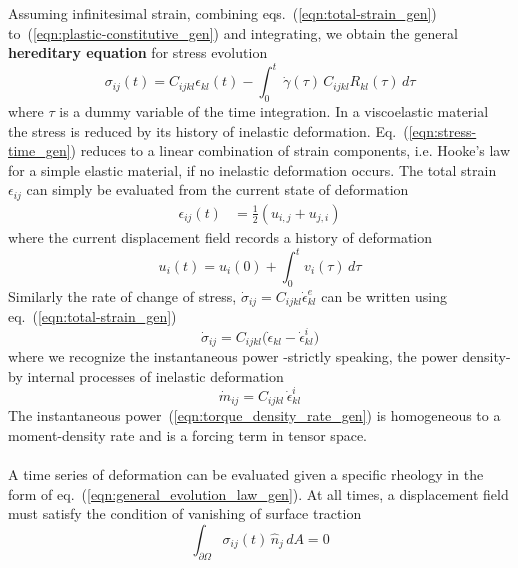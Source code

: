 \documentclass[letterpaper,12pt,]{memoir}
\begin{document}
Assuming infinitesimal strain, combining eqs.~(\ref{eqn:total-strain_gen}) to~(\ref{eqn:plastic-constitutive_gen}) and integrating, we obtain the general \textbf{hereditary equation} for stress evolution
%
\begin{equation}\label{eqn:stress-time_gen}
\sigma_{ij}(t)=C_{ijkl}\epsilon_{kl}(t)-\int_0^t\,\dot{\gamma}(\tau)\,C_{ijkl}R_{kl}(\tau)\,d\tau
\end{equation}
%
where $\tau$ is a dummy variable of the time integration. In a viscoelastic material the stress is reduced by its history of inelastic deformation. Eq.~(\ref{eqn:stress-time_gen}) reduces to a linear combination of strain components, i.e. Hooke's law for a simple elastic material, if no inelastic deformation occurs. The total strain $\epsilon_{ij}$ can simply be evaluated from the current state of deformation 
%
\begin{equation}\label{eqn:gradient}
\begin{aligned}
\epsilon_{ij}(t)&=\frac{1}{2}\left(u_{i,j}+u_{j,i}\right)
\end{aligned}
\end{equation}
%
where the current displacement field records a history of deformation
%
\begin{equation}\label{eqn:displacement-velocity}
u_i(t)=u_i(0)+\int_0^tv_i(\tau)\,d\tau
\end{equation}
%
Similarly the rate of change of stress, $\dot{\sigma}_{ij}=C_{ijkl}\dot{\epsilon}_{kl}^e$ can be written using eq.~(\ref{eqn:total-strain_gen})
\begin{equation}\label{eqn:stress_rate_gen}
\dot{\sigma}_{ij}=C_{ijkl}\big(\dot{\epsilon}_{kl}-\dot{\epsilon}_{kl}^i\big)
\end{equation}
where we recognize the instantaneous power -strictly speaking, the power density- by internal processes of inelastic deformation
\begin{equation}\label{eqn:torque_density_rate_gen}
\dot{m}_{ij}=C_{ijkl}\,\dot{\epsilon}_{kl}^i
\end{equation}
The instantaneous power~(\ref{eqn:torque_density_rate_gen}) is homogeneous to a moment-density rate and is a forcing term in tensor space. \\
\\
A time series of deformation can be evaluated given a specific rheology in the form of eq.~(\ref{eqn:general_evolution_law_gen}). At all times, a displacement field must satisfy the condition of vanishing of surface traction
\begin{equation}\label{eqn:vanishing_traction_gen}
\int_{\partial\Omega}\sigma_{ij}(t)\,\hat{n}_j\,dA=0
\end{equation}
\end{document}
